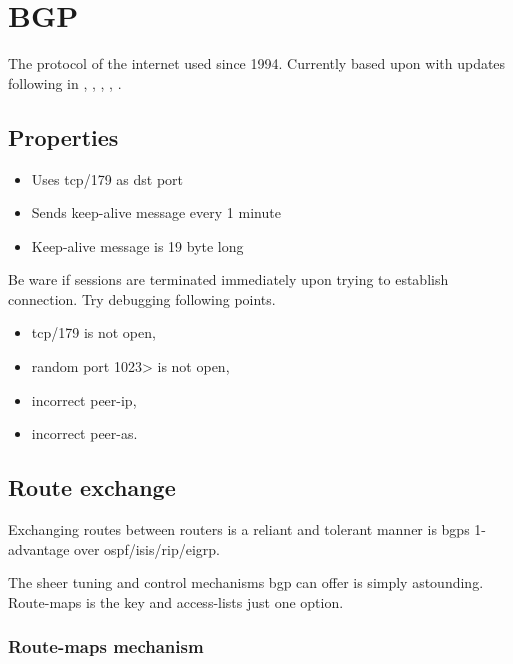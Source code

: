 \newpage

\section{BGP}


The protocol of the internet used since 1994.\cite{wiki:Border_Gateway_Protocol}
Currently based upon  with updates following in  , , , , .

\subsection{Properties}

\begin{itemize}
    \item Uses tcp/179 as \gls{dst} port
    \item Sends keep-alive message every 1 minute
    \item Keep-alive message is 19 byte long
\end{itemize}

Be ware if sessions are terminated immediately upon trying to establish connection. Try debugging following points.

\begin{itemize}
    \item tcp/179 is not open,
    \item random port 1023> is not open,
    \item incorrect peer-ip,
    \item incorrect peer-as.
\end{itemize}

\subsection{Route exchange}

Exchanging routes between routers is a reliant and tolerant manner is \glspl{bgp} 1-advantage over \gls{ospf}/\gls{isis}/\gls{rip}/\gls{eigrp}.

The sheer tuning and control mechanisms \gls{bgp} can offer is simply astounding. Route-maps is the key and access-lists just one option.

\subsubsection[Route-maps]{Route-maps mechanism}

